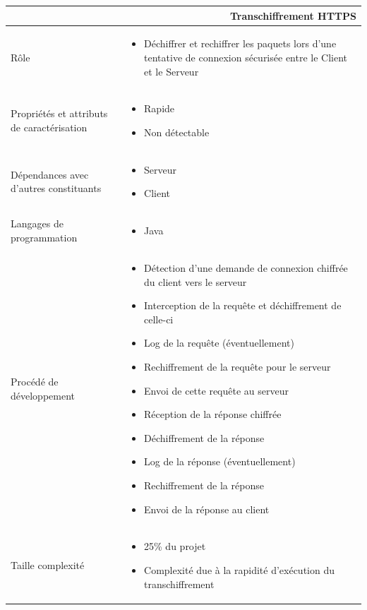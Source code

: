 \documentclass[a4paper,11pt,french]{article}
\begin{document}
\begin{center}
        \vspace*{0.7cm}
        \begin{tabularx}{16cm}{|l|X|}
        \hline
        \multicolumn{2}{|r|}{\textbf{Transchiffrement HTTPS}}\\
        \hline
        R\^ole &  \begin{itemize}\item Déchiffrer et rechiffrer les paquets lors d'une tentative de connexion sécurisée entre le Client et le Serveur\end{itemize}\\
        \hline
        Propriétés et attributs de caractérisation & \begin{itemize} \item Rapide \item Non détectable\end{itemize}\\
        \hline
        Dépendances avec d'autres constituants & \begin{itemize}\item Serveur \item Client\end{itemize}\\
        \hline
        Langages de programmation & \begin{itemize} \item Java \end{itemize}\\
        \hline
        Procédé de développement & \begin{itemize}\item Détection d'une demande de connexion chiffrée du client vers le serveur \item Interception de la requête et déchiffrement de celle-ci \item Log de la requête (éventuellement)\item Rechiffrement de la requête pour le serveur
\item Envoi de cette requête au serveur \item Réception de la réponse chiffrée \item Déchiffrement de la réponse \item Log de la réponse (éventuellement)\item Rechiffrement de la réponse \item Envoi de la réponse au client 
        \end{itemize}\\
        \hline
        Taille complexité & \begin{itemize}\item 25\% du projet \item Complexité due à la rapidité d'exécution du transchiffrement \end{itemize}\\
        \hline
        \end{tabularx}
\end{center}
\end{document}

